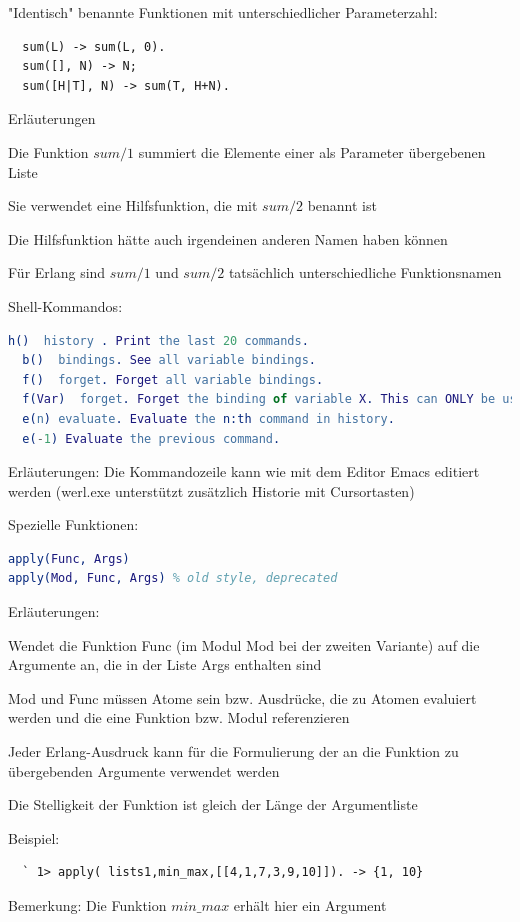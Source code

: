 \documentclass[10pt]{article}
\begin{document}
"Identisch" benannte Funktionen mit unterschiedlicher Parameterzahl:
\begin{lstlisting}
  sum(L) -> sum(L, 0).
  sum([], N) -> N;
  sum([H|T], N) -> sum(T, H+N).
\end{lstlisting}
\begin{itemize*}
  \item Erläuterungen
  \item Die Funktion $sum/1$ summiert die Elemente einer als Parameter übergebenen Liste
  \item Sie verwendet eine Hilfsfunktion, die mit $sum/2$ benannt ist
  \item Die Hilfsfunktion hätte auch irgendeinen anderen Namen haben können
  \item Für Erlang sind $sum/1$ und $sum/2$ tatsächlich unterschiedliche Funktionsnamen
\end{itemize*}

Shell-Kommandos:
\begin{lstlisting}[language=erlang]
  h()  history . Print the last 20 commands.
  b()  bindings. See all variable bindings.
  f()  forget. Forget all variable bindings.
  f(Var)  forget. Forget the binding of variable X. This can ONLY be used as a command to the shell - NOT in the body of a function!
  e(n) evaluate. Evaluate the n:th command in history.
  e(-1) Evaluate the previous command.
\end{lstlisting}
Erläuterungen: Die Kommandozeile kann wie mit dem Editor Emacs editiert werden (werl.exe unterstützt zusätzlich Historie mit Cursortasten)

Spezielle Funktionen:
\begin{lstlisting}[language=erlang]
apply(Func, Args)
apply(Mod, Func, Args) % old style, deprecated
\end{lstlisting}
\begin{itemize*}
  \item Erläuterungen:
  \item Wendet die Funktion Func (im Modul Mod bei der zweiten Variante) auf die Argumente an, die in der Liste Args enthalten sind
  \item Mod und Func müssen Atome sein bzw. Ausdrücke, die zu Atomen evaluiert werden und die eine Funktion bzw. Modul referenzieren
  \item Jeder Erlang-Ausdruck kann für die Formulierung der an die Funktion zu übergebenden Argumente verwendet werden
  \item Die Stelligkeit der Funktion ist gleich der Länge der Argumentliste
  \item Beispiel:
  \begin{lstlisting}
  ` 1> apply( lists1,min_max,[[4,1,7,3,9,10]]). -> {1, 10}
  \end{lstlisting}
  \item Bemerkung: Die Funktion $min\_max$ erhält hier ein Argument
\end{itemize*}
\end{document}

